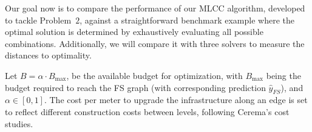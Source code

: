 \documentclass[lettersize,journal]{IEEEtran}
\begin{document}




Our goal now is to compare the performance of our MLCC algorithm, developed to tackle Problem~$2$, against a straightforward benchmark example where the optimal solution is determined by exhaustively evaluating all possible combinations. Additionally, we will compare it with three solvers to measure the distances to optimality.

Let $B = \alpha \cdot B_{\text{max}}$, be the available budget for optimization, with $B_{\text{max}}$ being the budget required to reach the FS graph (with corresponding prediction $\hat y_{FS}$), and $\alpha \in \left [ 0,1\right]$. The cost per meter to upgrade the infrastructure along an edge is set to reflect different construction costs between levels, following Cerema's cost \cite{cerema2024_cost} studies. 
\end{document}
